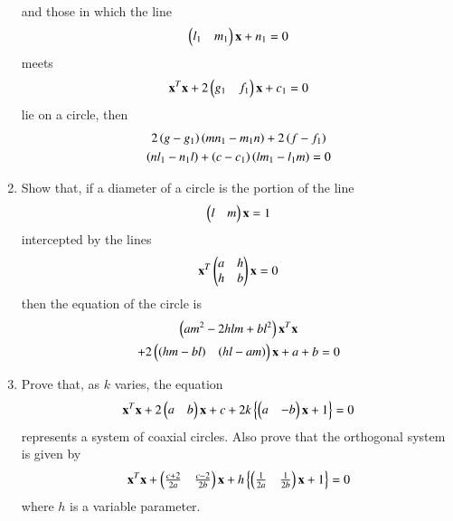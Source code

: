 \begin{enumerate}[label=\arabic*.,ref=\thesubsection.\theenumi]
\begin{align}
 \end{align}
 and those in which the line 
 \begin{align}
\begin{pmatrix}l_1 & m_1\end{pmatrix}\mathbf{x}+n_1=0
 \end{align}
 meets 
 \begin{align}
\mathbf{x}^T\mathbf{x}+2\begin{pmatrix}g_1 & f_1\end{pmatrix}\mathbf{x}+c_1 = 0
 \end{align}
lie on a circle,
 then 
 \begin{multline}
 2\left(g-g_1\right)\left(mn_1-m_1n\right)+2\left(f-f_1\right)
 \\
 \left(nl_1-n_1l\right)+\left(c-c_1\right)\left(lm_1-l_1m\right)=0
 \end{multline}
 \item Show that, if a diameter of a circle is the portion of the line 
 \begin{align}
\begin{pmatrix}l & m\end{pmatrix}\mathbf{x}=1
 \end{align}
intercepted by the lines 
 \begin{align}
\mathbf{x}^T\begin{pmatrix}a & h\\h & b\end{pmatrix}\mathbf{x} = 0
 \end{align}
 then the 
 equation of the circle is
 \begin{multline}
\left(am^2-2hlm+bl^2\right)\mathbf{x}^T\mathbf{x}
\\
+2\begin{pmatrix}\left(hm-bl\right) & \left(hl-am\right)\end{pmatrix}\mathbf{x}+ a+b = 0
 \end{multline}
\item Prove that, as $k$ varies, the equation
 \begin{align}
\mathbf{x}^T\mathbf{x}+2\begin{pmatrix}a & b\end{pmatrix}\mathbf{x}+c + 2k\left\{\begin{pmatrix}a & -b\end{pmatrix}\mathbf{x}+1\right\}= 0
 \end{align}
 represents a system of coaxial circles.  Also prove that the orthogonal system is given by
 \begin{align}
\mathbf{x}^T\mathbf{x}+\begin{pmatrix}\frac{c+2}{2a} & \frac{c-2}{2b}\end{pmatrix}\mathbf{x}+h\left\{\begin{pmatrix}\frac{1}{2a}&\frac{1}{2b}\end{pmatrix}\mathbf{x} + 1\right\} = 0
 \end{align}
 where $h$ is a variable parameter.
\end{enumerate}

